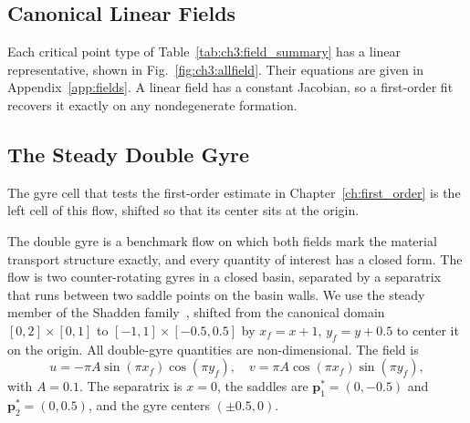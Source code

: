 \subsection{Canonical Linear Fields}
\label{sec:ch3:canonical}

Each critical point type of Table~\ref{tab:ch3:field_summary} has a
linear representative, shown in Fig.~\ref{fig:ch3:allfield}. Their
equations are given in Appendix~\ref{app:fields}. A linear field has a
constant Jacobian, so a first-order fit recovers it exactly on any
nondegenerate formation.

\subsection{The Steady Double Gyre}
\label{sec:ch3:dg_example}

The gyre cell that tests the first-order estimate in
Chapter~\ref{ch:first_order} is the left cell of this flow, shifted so that
its center sits at the origin.

The double gyre is
a benchmark flow on which both fields mark the material transport structure
exactly, and every
quantity of interest has a closed form. The flow is two counter-rotating gyres in a
closed basin, separated by a separatrix that runs between two saddle points on
the basin walls. We use the steady member of the Shadden
family~\cite{52}, shifted from the canonical domain
$[0,2]\times[0,1]$ to $[-1,1]\times[-0.5,0.5]$ by $x_f = x + 1$,
$y_f = y + 0.5$ to center it on the origin. All double-gyre quantities are
non-dimensional. The field is
\begin{equation}
u = -\pi A \sin(\pi x_f)\cos(\pi y_f), \quad
v = \pi A \cos(\pi x_f)\sin(\pi y_f),
\label{eq:ch3:dg_u}
\end{equation}
with $A = 0.1$. The separatrix is $x = 0$, the saddles are
$\mathbf{p}_1^* = (0, -0.5)$ and $\mathbf{p}_2^* = (0, 0.5)$, and the gyre
centers $(\pm 0.5, 0)$.

